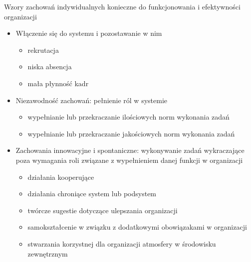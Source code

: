 \documentclass[a4paper,10pt]{report}
\begin{document}
\noindent Wzory zachowań indywidualnych konieczne do funkcjonowania i efektywności organizacji
\begin{itemize}
	\item Włączenie się do systemu i pozostawanie w nim
	\begin{itemize}
		\item rekrutacja
		\item niska absencja
		\item mała płynność kadr
	\end{itemize}
	\item Niezawodność zachowań: pełnienie ról w systemie
	\begin{itemize}
		\item wypełnianie lub przekraczanie ilościowych norm wykonania zadań
		\item wypełnianie lub przekraczanie jakościowych norm wykonania zadań
	\end{itemize}
	\item Zachowania innowacyjne i spontaniczne: wykonywanie zadań wykraczające poza wymagania roli związane z wypełnieniem danej funkcji w organizacji
	\begin{itemize}
		\item działania kooperujące
		\item działania chroniące system lub podsystem
		\item twórcze sugestie dotyczące ulepszania organizacji
		\item samokształcenie w związku z dodatkowymi obowiązakami w organizacji
		\item stwarzania korzystnej dla organizacji atmosfery w środowisku zewnętrznym
	\end{itemize}
\end{itemize}
\end{document}
